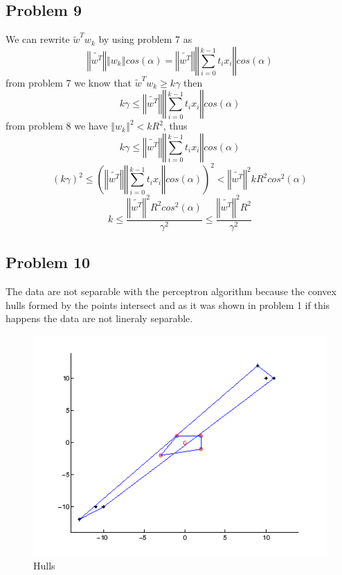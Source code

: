 \subsection*{Problem 9}
We can rewrite $\tilde{w}^{T}w_{k}$ by using problem 7 as 
\[
\left\Vert \tilde{w^{T}}\right\Vert \left\Vert w_{k}\right\Vert
cos(\alpha)=\left\Vert \tilde{w^{T}}\right\Vert \left\Vert
\sum_{i=0}^{k-1}t_{i}x_{i}\right\Vert cos(\alpha)
\]
from problem 7 we know that $\tilde{w}^{T}w_{k}\geq k\gamma$ then
\[
k\gamma\leq\left\Vert \tilde{w^{T}}\right\Vert \left\Vert
\sum_{i=0}^{k-1}t_{i}x_{i}\right\Vert cos(\alpha)
\]
from problem 8 we have $\left\Vert w_{k}\right\Vert ^{2}<kR^{2}$,
thus 
\[
k\gamma\leq\left\Vert \tilde{w^{T}}\right\Vert \left\Vert
\sum_{i=0}^{k-1}t_{i}x_{i}\right\Vert cos(\alpha)
\]
\[
\left(k\gamma\right)^{2}\leq\left(\left\Vert \tilde{w^{T}}\right\Vert
\left\Vert \sum_{i=0}^{k-1}t_{i}x_{i}\right\Vert
cos(\alpha)\right)^{2}<\left\Vert \tilde{w^{T}}\right\Vert
^{2}kR^{2}cos^{2}(\alpha)
\]
\[
k\leq\frac{\left\Vert \tilde{w^{T}}\right\Vert
^{2}R^{2}cos^{2}(\alpha)}{\gamma^{2}}\leq\frac{\left\Vert
\tilde{w^{T}}\right\Vert ^{2}R^{2}}{\gamma^{2}}
\]
  
\newpage
\subsection*{Problem 10}
The data are not separable with the perceptron algorithm because the convex
hulls formed by the points intersect and as it was shown in problem 1 if this 
happens the data are not lineraly separable.
\begin{figure}
\centering{}\includegraphics[width=1\textwidth]{plots/10_hull}\caption{Hulls}
\end{figure}

